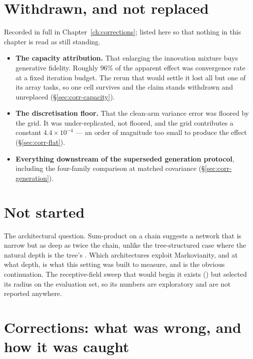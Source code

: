\section{Withdrawn, and not replaced}

Recorded in full in Chapter~\ref{ch:corrections}; listed here so that nothing in this chapter is
read as still standing.

\begin{itemize}\itemsep3pt
\item \textbf{The capacity attribution.} That enlarging the innovation mixture buys generative
      fidelity. Roughly $96\%$ of the apparent effect was convergence rate at a fixed iteration
      budget. The rerun that would settle it lost all but one of its array tasks, so one cell
      survives and the claim stands withdrawn and unreplaced (\S\ref{sec:corr-capacity}).
\item \textbf{The discretisation floor.} That the clean-arm variance error was floored by the
      grid. It was under-replicated, not floored, and the grid contributes a constant
      $4.4\times10^{-4}$ --- an order of magnitude too small to produce the effect
      (\S\ref{sec:corr-flat}).
\item \textbf{Everything downstream of the superseded generation protocol}, including the
      four-family comparison at matched covariance (\S\ref{sec:corr-generation}).
\end{itemize}

\section{Not started}

The architectural question. Sum-product on a chain suggests a network that is narrow but as deep
as twice the chain, unlike the tree-structured case where the natural depth is the tree's
\citep{mei2024unets,garnierbrun2024transformers}. Which architectures exploit Markovianity, and at
what depth, is what this setting was built to measure, and is the obvious continuation. The
receptive-field sweep that would begin it exists () but selected its radius on
the evaluation set, so its numbers are exploratory and are not reported anywhere.


\section{Corrections: what was wrong, and how it was caught}
\label{part:audit-corrections}

